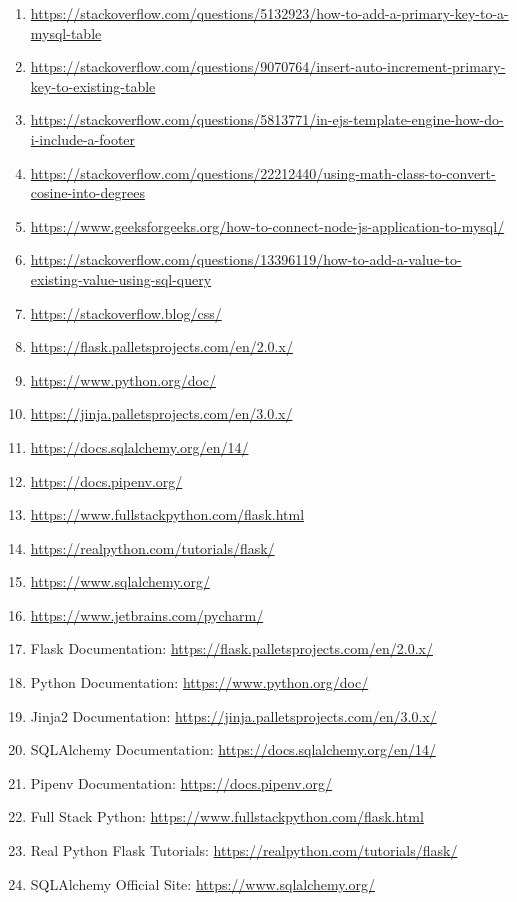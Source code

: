 \begin{enumerate}
    \item \raggedright \url{https://stackoverflow.com/questions/5132923/how-to-add-a-primary-key-to-a-mysql-table}
    \item \raggedright \url{https://stackoverflow.com/questions/9070764/insert-auto-increment-primary-key-to-existing-table}
    \item \raggedright \url{https://stackoverflow.com/questions/5813771/in-ejs-template-engine-how-do-i-include-a-footer}
    \item \raggedright \url{https://stackoverflow.com/questions/22212440/using-math-class-to-convert-cosine-into-degrees}
    \item \raggedright \url{https://www.geeksforgeeks.org/how-to-connect-node-js-application-to-mysql/}
    \item \raggedright \url{https://stackoverflow.com/questions/13396119/how-to-add-a-value-to-existing-value-using-sql-query}
    \item \raggedright \url{https://stackoverflow.blog/css/}

    \item \raggedright \url{https://flask.palletsprojects.com/en/2.0.x/}
    \item \raggedright \url{https://www.python.org/doc/}
    \item \raggedright \url{https://jinja.palletsprojects.com/en/3.0.x/}
    \item \raggedright \url{https://docs.sqlalchemy.org/en/14/}
    \item \raggedright \url{https://docs.pipenv.org/}
    \item \raggedright \url{https://www.fullstackpython.com/flask.html}
    \item \raggedright \url{https://realpython.com/tutorials/flask/}
    \item \raggedright \url{https://www.sqlalchemy.org/}
    \item \raggedright \url{https://www.jetbrains.com/pycharm/}

    \item \raggedright Flask Documentation: \url{https://flask.palletsprojects.com/en/2.0.x/}
    \item \raggedright Python Documentation: \url{https://www.python.org/doc/}
    \item \raggedright Jinja2 Documentation: \url{https://jinja.palletsprojects.com/en/3.0.x/}
    \item \raggedright SQLAlchemy Documentation: \url{https://docs.sqlalchemy.org/en/14/}
    \item \raggedright Pipenv Documentation: \url{https://docs.pipenv.org/}
    \item \raggedright Full Stack Python: \url{https://www.fullstackpython.com/flask.html}
    \item \raggedright Real Python Flask Tutorials: \url{https://realpython.com/tutorials/flask/}
    \item \raggedright SQLAlchemy Official Site: \url{https://www.sqlalchemy.org/}
\end{enumerate}

